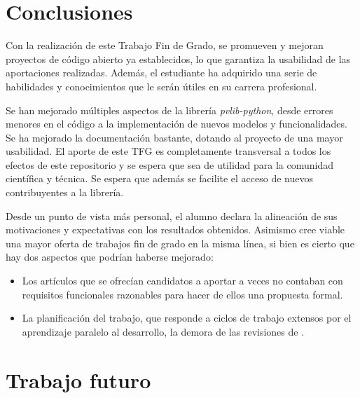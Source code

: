 
\section{Conclusiones} \label{sct:resultados:conclusiones}

Con la realización de este Trabajo Fin de Grado, se promueven y mejoran proyectos de código abierto ya establecidos, lo que garantiza la usabilidad de las aportaciones realizadas. Además, el estudiante ha adquirido una serie de habilidades y conocimientos que le serán útiles en su carrera profesional.

Se han mejorado múltiples aspectos de la librería \textit{pvlib-python}, desde errores menores en el código a la implementación de nuevos modelos y funcionalidades. Se ha mejorado la documentación bastante, dotando al proyecto de una mayor usabilidad. El aporte de este TFG es completamente transversal a todos los efectos de este repositorio y se espera que sea de utilidad para la comunidad científica y técnica. Se espera que además se facilite el acceso de nuevos contribuyentes a la librería.

Desde un punto de vista más personal, el alumno declara la alineación de sus motivaciones y expectativas con los resultados obtenidos. Asimismo cree viable una mayor oferta de trabajos fin de grado en la misma línea, si bien es cierto que hay dos aspectos que podrían haberse mejorado:

\begin{itemize}
    \item Los artículos que se ofrecían candidatos a aportar a veces no contaban con requisitos funcionales razonables para hacer de ellos una propuesta formal.
    \item La planificación del trabajo, que responde a ciclos de trabajo extensos por el aprendizaje paralelo al desarrollo, la demora de las revisiones de .
\end{itemize}


\section{Trabajo futuro} \label{sct:resultados:trabajofuturo}

